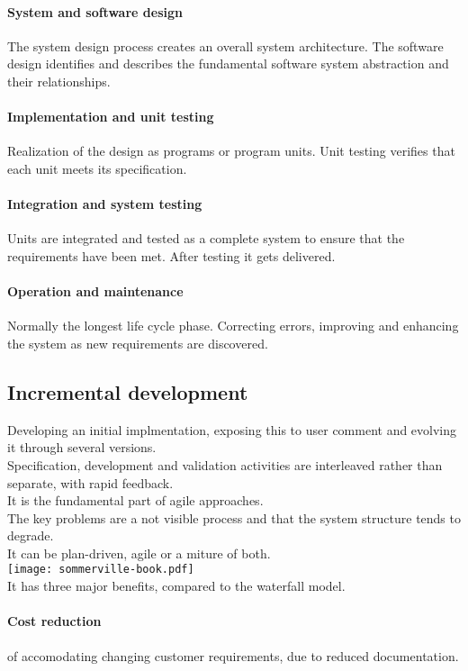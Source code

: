 \documentclass[a4paper,11pt,twocolumn]{report}
\begin{document}
    \paragraph{System and software design}
    The system design process creates an overall system architecture.
    The software design identifies and describes the fundamental software
    system abstraction and their relationships.
    \paragraph{Implementation and unit testing}
    Realization of the design as programs or program units. Unit testing
    verifies that each unit meets its specification.
    \paragraph{Integration and system testing}
    Units are integrated and tested as a complete system to ensure that the
    requirements have been met. After testing it gets delivered.
    \paragraph{Operation and maintenance}
    Normally the longest life cycle phase. Correcting errors, improving and
    enhancing the system as new requirements are discovered.
    \subsection{Incremental development}
    Developing an initial implmentation, exposing this to user comment and
    evolving it through several versions.\\
    Specification, development and validation activities are interleaved rather
    than separate, with rapid feedback.\\
    It is the fundamental part of agile approaches.\\
    The key problems are a not visible process and that the system structure
    tends to degrade.\\
    It can be plan-driven, agile or a miture of both.\\
    \texttt{[image: sommerville-book.pdf]}\\
    It has three major benefits, compared to the waterfall model.
    \paragraph{Cost reduction}
    of accomodating changing customer requirements, due to reduced
    documentation.
\end{document}
